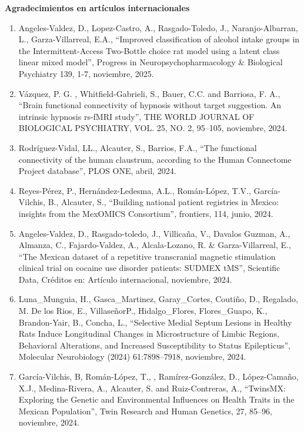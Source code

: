 {\large \textbf{\color{red}\textbf{Agradecimientos en artículos internacionales}}}

\begin{enumerate}

\item Angeles-Valdez, D., Lopez-Castro, A., Rasgado-Toledo, J., Naranjo-Albarran, L., 
Garza-Villarreal, 
E.A., “Improved classification of alcohol intake groups in the Intermittent-Access Two-Bottle choice 
rat model using a latent class linear mixed model”, Progress in Neuropsychopharmacology & Biological 
Psychiatry 139, 1-7, noviembre, 2025.

\item Vázquez, P. G. , Whitfield-Gabrieli, S., Bauer, C.C. and Barriosa, F. A., “Brain functional 
connectivity of hypnosis without target suggestion. An intrinsic hypnosis rs-fMRI study”, THE WORLD 
JOURNAL OF BIOLOGICAL PSYCHIATRY, VOL. 25, NO. 2, 95–105, noviembre, 2024.

\item Rodríguez-Vidal, LL., Alcauter, S., Barrios, F.A., “The functional connectivity of the 
human 
claustrum, according to the Human Connectome Project database”, PLOS ONE, abril, 2024.

\item Reyes-Pérez, P., Hernández-Ledesma, A.L., Román-López, T.V., García-Vilchis, B., Alcauter, 
S., 
“Building national patient registries in Mexico: insights from the MexOMICS Consortium”, frontiers, 
114, junio, 2024.

\item Angeles-Valdez, D., Rasgado-toledo, J., Villicaña, V., Davalos Guzman, A., Almanza, C., 
Fajardo-Valdez, A., Alcala-Lozano, R. & Garza-Villarreal, E., “The Mexican dataset of a repetitive 
transcranial magnetic stimulation clinical trial on cocaine use disorder patients: SUDMEX tMS”, 
Scientific Data, Créditos en: Artículo internacional, noviembre, 2024.

\item Luna_Munguia, H., Gasca_Martinez, Garay_Cortes, Coutiño, D., Regalado, M. De los Rios, E., 
VillaseñorP., Hidalgo_Flores, Flores_Guapo, K., Brandon-Yair, B., Concha, L., “Selective Medial 
Septum Lesions in Healthy Rats Induce Longitudinal Changes in Microstructure of Limbic Regions, 
Behavioral Alterations, and Increased Susceptibility to Status Epilepticus”, Molecular Neurobiology 
(2024) 61:7898–7918, noviembre, 2024.

\item  García-Vilchis, B, Román-López, T., , Ramírez-González, D., López-Camaño, X.J., 
Medina-Rivera, 
A., Alcauter, S. and Ruiz-Contreras, A., “TwinsMX: Exploring the Genetic and Environmental 
Influences on Health Traits in the Mexican Population”, Twin Research and Human Genetics, 27, 85–96, noviembre, 2024.


\end{enumerate}
